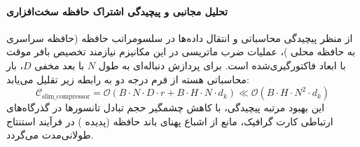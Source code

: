 \paragraph{تحلیل مجانبی و پیچیدگی اشتراک حافظه سخت‌افزاری}
از منظر پیچیدگی محاسباتی و انتقال داده‌ها در سلسومراتب حافظه (حافظه سراسری  به حافظه محلی )، عملیات ضرب ماتریسی در این مکانیزم نیازمند تخصیص بافر موقت با ابعاد فاکتورگیری‌شده است. برای پردازش دنباله‌ای به طول $N$ با بعد مخفی $D$، بار محاسباتی هسته از فرم درجه دو به رابطه زیر تقلیل می‌یابد:
\begin{equation}
\label{eq:complexity_slim_compressor}
\mathcal{C}_{\text{slim\_compressor}} = \mathcal{O}\left( B \cdot N \cdot D \cdot r + B \cdot H \cdot N \cdot d_k \right) \ll \mathcal{O}\left( B \cdot H \cdot N^2 \cdot d_k \right)
\end{equation}
این بهبود مرتبه پیچیدگی، با کاهش چشمگیر حجم تبادل تانسورها در گذرگاه‌های ارتباطی کارت گرافیک، مانع از اشباع پهنای باند حافظه (پدیده ) در فرآیند استنتاج طولانی‌مدت می‌گردد.
